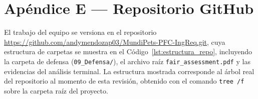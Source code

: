 \documentclass[journal,onecolumn]{IEEEtran}
\begin{document}
	\newpage

	\section*{Apéndice E --- Repositorio GitHub}
	\label{ap:repositorio}
	
	El trabajo del equipo se versiona en el repositorio
	\url{https://github.com/andymendozap03/MundiPets-PFC-IngReq.git}, cuya
	estructura de carpetas se muestra en el Código~\ref{lst:estructura_repo},
	incluyendo la carpeta de defensa (\texttt{09\_Defensa/}), el archivo raíz
	\texttt{fair\_assessment.pdf} y las evidencias del análisis terminal. La
	estructura mostrada corresponde al árbol real del repositorio al momento de
	esta revisión, obtenido con el comando \texttt{tree /f} sobre la carpeta
	raíz del proyecto.
\end{document}
